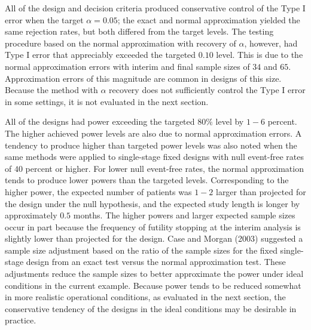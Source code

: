 \documentclass[12pt]{article}
\begin{document}
All of the design and decision criteria produced conservative control of the Type I error when the
target $\alpha=0.05$;  the exact and normal approximation yielded the same rejection rates, but
both differed from the target levels.  The testing procedure based on the normal approximation with
recovery of $\alpha$, however, had Type I error that appreciably exceeded the targeted $0.10$
level.  This is due to the normal approximation errors with interim and final sample sizes of $34$
and $65$.  Approximation errors of this magnitude are common in designs of this size.  Because the
method with $\alpha$ recovery does not sufficiently control the Type I error in some settings, it
is not evaluated in the next section.


All of the designs had power exceeding the targeted $80\%$ level by $1-6$ percent.  The higher
achieved power levels are also due to normal approximation errors.  A tendency to produce higher
than targeted power levels was also noted when the same methods were applied to single-stage fixed
designs with null event-free rates of $40$ percent or higher.  For lower null event-free rates, the
normal approximation tends to produce lower powers than the targeted levels. Corresponding to the
higher power, the expected number of patients was $1-2$ larger than projected for the design under
the null hypothesis, and the expected study length is longer by approximately $0.5$ months.  The
higher powers and larger expected sample sizes occur in part because the frequency of futility
stopping at the interim analysis is slightly lower than projected for the design.  Case and Morgan
(2003) suggested a sample size adjustment based on the ratio of the sample sizes for the fixed
single-stage design from an exact test versus the normal approximation test.  These adjustments
reduce the sample sizes to better approximate the power under ideal conditions in the current
example. Because power tends to be reduced somewhat in more realistic operational conditions, as
evaluated in the next section, the conservative tendency of the designs in the ideal conditions may
be desirable in practice.
\end{document}
